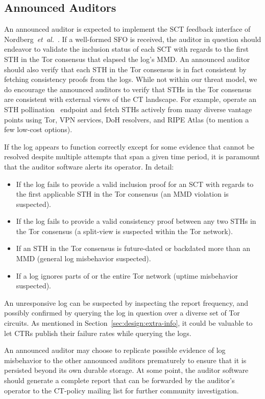 \subsection{Announced Auditors} \label{sec:design:auditor}
An announced auditor is expected to implement the SCT feedback interface of
Nordberg~\emph{et~al.}~\cite{nordberg}.  If a well-formed SFO is received, the
auditor in question should endeavor to validate the inclusion status of each SCT
with regards to the first STH in the Tor consensus that elapsed the log's MMD.
An announced auditor should also verify that each STH in the Tor consensus is
in fact consistent by fetching consistency proofs from the logs.
While not within our threat model, we do encourage the announced auditors to
verify that STHs in the Tor consensus are consistent with external views of the
CT landscape.  For example, operate an STH pollination~\cite{nordberg} endpoint
and fetch STHs actively from many diverse vantage points using Tor, VPN
services, DoH resolvers, and RIPE Atlas (to mention a few low-cost options).

If the log appears to function correctly except for some evidence that cannot be
resolved despite multiple attempts that span a given time period, it is
paramount that the auditor software alerts its operator.  In detail:
\begin{itemize}
	\item If the log fails to provide a valid inclusion proof for an SCT with
		regards to the first applicable STH in the Tor consensus
		(an MMD violation is suspected).
	\item If the log fails to provide a valid consistency proof between any two
		STHs in the Tor consensus
		(a split-view is suspected within the Tor network).
	\item If an STH in the Tor consensus is future-dated or backdated more than
		an MMD (general log misbehavior suspected).
	\item If a log ignores parts of or the entire Tor network (uptime
		misbehavior suspected).
\end{itemize}

An unresponsive log can be suspected by inspecting the report frequency, and
possibly confirmed by querying the log in question over a diverse set of Tor
circuits.  As mentioned in Section~\ref{sec:design:extra-info}, it could be
valuable to let CTRs publish their failure rates while querying the logs.

An announced auditor may choose to replicate possible evidence of log
misbehavior to the other announced auditors prematurely to ensure that
it is persisted beyond its own durable storage.  At some point, the auditor
software should generate a complete report that can be forwarded by the
auditor's operator to the CT-policy mailing list for further community
investigation.


